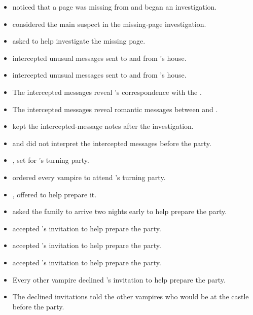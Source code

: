 \begin{itemize}
  \item {} noticed that a page was missing from  and began an investigation.
  \item {} considered  the main suspect in the missing-page investigation.
  \item {} asked  to help investigate the missing page.
  \item {} intercepted unusual messages sent to and from 's house.
  \item {} intercepted unusual messages sent to and from 's house.
  \item The intercepted messages reveal 's correspondence with the .
  \item The intercepted messages reveal romantic messages between  and .
  \item {} kept the intercepted-message notes after the investigation.
  \item {} and  did not interpret the intercepted messages before the party.
  \item {},  set  for 's turning party.
  \item {} ordered every vampire to attend 's turning party.
  \item {},  offered to help  prepare it.
  \item {} asked the family to arrive two nights early to help prepare the party.
  \item {} accepted 's invitation to help prepare the party.
  \item {} accepted 's invitation to help prepare the party.
  \item {} accepted 's invitation to help prepare the party.
  \item Every other vampire declined 's invitation to help prepare the party.
  \item The declined invitations told the other vampires who would be at the castle before the party.


\end{itemize}
